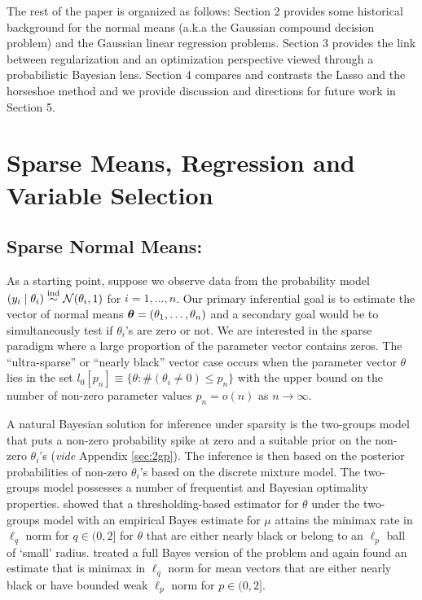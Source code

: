 \documentclass[11pt]{article}
\begin{document}

The rest of the paper is organized as follows: Section 2 provides some historical background for the normal means (a.k.a the Gaussian compound decision problem) and the Gaussian linear regression problems. Section 3 provides the link between regularization and an optimization perspective viewed through a probabilistic Bayesian lens. Section 4 compares and contrasts the Lasso and the horseshoe method and we provide discussion and directions for future work in Section 5. 

\section{Sparse Means, Regression and Variable Selection}

\subsection{Sparse Normal Means:} As a starting point, suppose we observe data from the probability model $  (y_i \mid \theta_i)  \stackrel{\mathrm{ind}}{\sim} {\cal N} (\theta_i,1)$ for
$i = 1, \ldots, n$. Our primary inferential goal is to estimate the vector of normal means $ \boldsymbol{\theta} = ( \theta_1, \ldots , \theta_n )$ and a secondary goal
would be to simultaneously test if $\theta_i$'s are zero or not. We are interested in the sparse paradigm where a large proportion of the parameter
vector contains zeros.  The ``ultra-sparse'' or ``nearly black'' vector case occurs when the parameter vector $\theta$ lies in the set $ l_0 [ p_n] \equiv
\{ \theta : \# ( \theta_i \neq 0 ) \leq p_n \} $ with the upper bound on the number of non-zero parameter values $ p_n = o(n) $ as $ n \to \infty$. 

A natural Bayesian solution for inference under sparsity is the two-groups model that puts a non-zero probability spike at zero and a suitable prior on
the non-zero $\theta_i$'s (\textit{vide} Appendix \ref{sec:2gp}). The inference is then based on the posterior probabilities of non-zero $\theta_i$'s based on the discrete mixture model. The two-groups model possesses a number of frequentist and Bayesian optimality properties. \cite{johnstone2004needles} showed that a thresholding-based
estimator for $\theta$ under the two-groups model with an empirical Bayes estimate for $\mu$ attains the minimax rate in $\ell_q$ norm for $q \in (0,2]$
for $\theta$ that are either nearly black or belong to an $\ell_p$ ball of `small' radius. \cite{castillo2012needles} treated a full Bayes version of the
problem and again found an estimate that is minimax in $\ell_q$ norm for mean vectors that are either nearly black or have bounded weak $\ell_p$ norm for $p
\in (0,2]$. 
\end{document}
